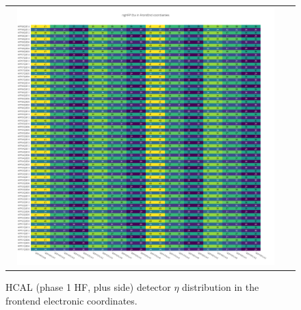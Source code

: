 \begin{figure}[htb]
 \begin{center}
  \begin{tabular}{cc}
   \includegraphics[angle=0,width=0.95\textwidth]{figures/appendix/ngHFP_Eta_in_FrontEnd.png}
  \end{tabular}
	\caption{HCAL (phase 1 HF, plus side) detector $\eta$ distribution in the frontend electronic coordinates.}
  \label{fig:lmapngHFPEtaFEC}
 \end{center}
\end{figure}
\clearpage

